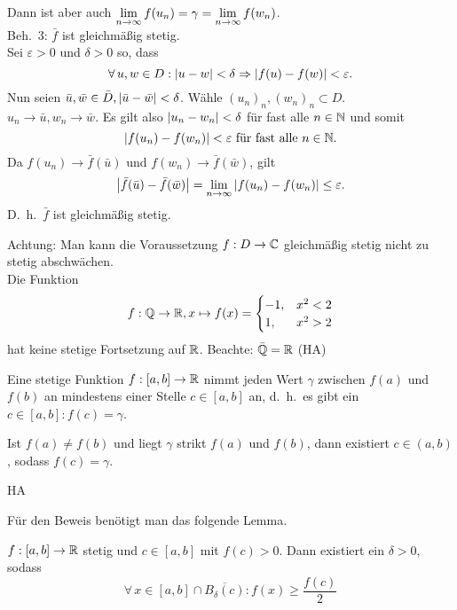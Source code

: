 \documentclass[../ana1.tex]{subfiles}
\begin{document}
\begin{bew}
    Dann ist aber auch \( \lim\limits_{n\rightarrow\infty} f(u_n) = \gamma 
    = \lim\limits_{n\rightarrow\infty}f(w_n) \).\\
    Beh.\ 3: \( \bar{f} \) ist gleichmäßig stetig.\\
    Sei \( \varepsilon > 0 \) und \( \delta > 0 \) so, 
    dass 
    \[ \forall \, u,w\in D : \left|u-w\right| < \delta 
    \Rightarrow \left|f(u)-f(w)\right| < \varepsilon. \]
    Nun seien \( \bar{u}, \bar{w} \in \bar{D}, 
    \left|\bar{u} - \bar{w}\right| < \delta \). Wähle 
    \( {(u_n)}_n, {(w_n)}_n \subset D \).\\
    \( u_n \rightarrow \bar{u}, w_n \rightarrow \bar{w} \). 
    Es gilt also \( \left|u_n - w_n\right| < \delta \) für 
    fast alle \( n\in\mathbb{N} \) und somit
    \[ \left|f(u_n) - f(w_n)\right| < \varepsilon 
    \text{ für fast alle } n\in\mathbb{N}. \]
    Da \( f(u_n) \rightarrow \bar{f}(\bar{u}) \) und 
    \( f(w_n) \rightarrow \bar{f}(\bar{w}) \), gilt
    \[ \left| \bar{f}(\bar{u}) - \bar{f}(\bar{w}) \right| 
    = \lim\limits_{n\rightarrow\infty} \left| f(u_n) - f(w_n) \right| \leq \varepsilon. \]
    D.\ h.\  \( \bar{f} \) ist gleichmäßig stetig.
\end{bew}
Achtung: Man kann die Voraussetzung 
\( f: D\rightarrow \mathbb{C} \) gleichmäßig stetig nicht zu 
stetig abschwächen.\\
Die Funktion 
\[ f: \mathbb{Q} \rightarrow \mathbb{R}, x \mapsto f(x) = 
\begin{cases}
    -1, &x^2 < 2\\
    1, &x^2 > 2
\end{cases} \]
hat keine stetige Fortsetzung auf \( \mathbb{R} \).
Beachte: \( \bar{\mathbb{Q}} = \mathbb{R} \) (HA)
\begin{satz}[Zwischenwertsatz]\label{satz:zwischenwert}
    Eine stetige Funktion \( f: [a,b] \rightarrow \mathbb{R} \) 
    nimmt jeden Wert \( \gamma \) zwischen \( f(a) \) 
    und \( f(b) \) an mindestens einer Stelle 
    \( c\in [a,b] \) an, d.\ h.\ es gibt ein 
    \( c \in [a,b] : f(c) = \gamma \).
\end{satz}
\begin{bem}
    Ist \( f(a) \neq f(b) \) und liegt \( \gamma \) strikt 
    \( f(a) \) und \( f(b) \), dann existiert 
    \( c \in (a,b) \), sodass \( f(c) = \gamma \).
\end{bem}
\begin{bew}
    HA
\end{bew}
Für den Beweis benötigt man das folgende Lemma.
\begin{lem}
    \( f: [a,b] \rightarrow \mathbb{R} \) stetig und 
    \( c \in [a,b] \) mit \( f(c) > 0 \). Dann existiert 
    ein \( \delta > 0 \), sodass 
    \[ \forall \, x\in [a,b] \cap \overline{B_\delta(c)} : 
    f(x) \geq \frac{f(c)}{2} \]
\end{lem}
\end{document}

